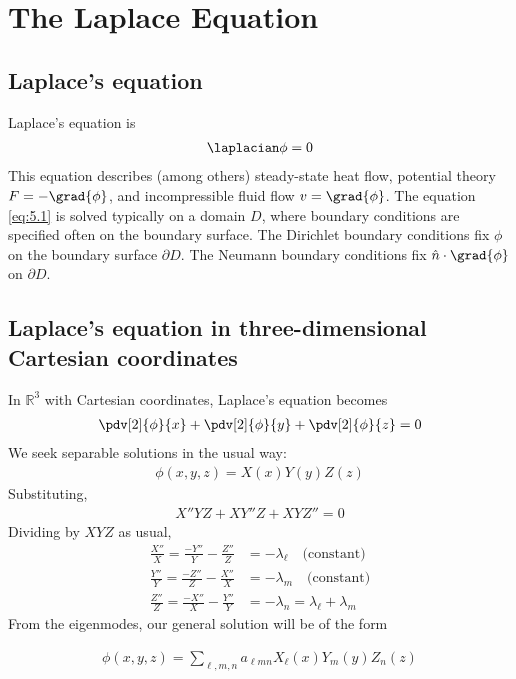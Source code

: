 \section{The Laplace Equation}

\subsection{Laplace's equation}
Laplace's equation is
\begin{align} \label{eq:5.1}
	\laplacian \phi = 0
\end{align}
This equation describes (among others) steady-state heat flow, potential theory $F = -\grad{\phi}$, and incompressible fluid flow $v = \grad{\phi}$.
The equation \cref{eq:5.1} is solved typically on a domain $D$, where boundary conditions are specified often on the boundary surface.
The Dirichlet boundary conditions fix $\phi$ on the boundary surface $\partial D$.
The Neumann boundary conditions fix $\hat n \cdot \grad{\phi}$ on $\partial D$.

\subsection{Laplace's equation in three-dimensional Cartesian coordinates}
In $\mathbb R^3$ with Cartesian coordinates, Laplace's equation becomes
\begin{align} \label{eq:5.2}
	\pdv[2]{\phi}{x} + \pdv[2]{\phi}{y} + \pdv[2]{\phi}{z} = 0
\end{align}
We seek separable solutions in the usual way:
\begin{align*}
	\phi(x,y,z) = X(x)Y(y)Z(z)
\end{align*}
Substituting,
\begin{align*}
	X''YZ + XY''Z + XYZ'' = 0
\end{align*}
Dividing by $XYZ$ as usual,
\begin{align*}
	\frac{X''}{X} = \frac{-Y''}{Y} - \frac{Z''}{Z} & = -\lambda_\ell \quad \text{(constant)}\\
	\frac{Y''}{Y} = \frac{-Z''}{Z} - \frac{X''}{X} & = -\lambda_m \quad \text{(constant)} \\
	\frac{Z''}{Z} = \frac{-X''}{X} - \frac{Y''}{Y} & = -\lambda_n = \lambda_\ell + \lambda_m
\end{align*}
From the eigenmodes, our general solution will be of the form
\addtocounter{equation}{1}
\begin{align} \label{eq:5.4}
	\phi(x,y,z) = \sum_{\ell,m,n} a_{\ell mn} X_\ell(x) Y_m(y) Z_n(z)
\end{align}

